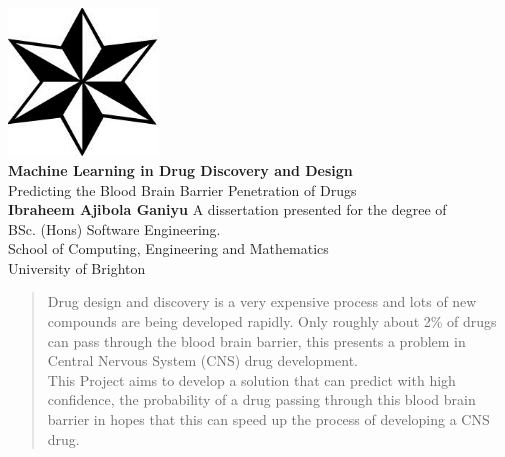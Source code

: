 \documentclass[a4paper,12pt]{report}
\begin{document}
\begin{titlepage}
	\begin{center}
		\includegraphics[scale=1,width=0.3\textwidth]{images/uob_logo} \\
		\huge
		\textbf{Machine Learning in Drug Discovery and Design\\}
		\vspace{0.5cm}
		\Large
		Predicting the Blood Brain Barrier Penetration of Drugs \\
		\vspace{1.5cm}
		\textbf{Ibraheem Ajibola Ganiyu}
		\vfill
		A dissertation presented for the degree of \\
		BSc. (Hons) Software Engineering. \\
		\vspace{0.8cm}
		\large
		School of Computing, Engineering and Mathematics \\
		University of Brighton \\
		\date{\today}
	\end{center}
\end{titlepage}

\tableofcontents
\newpage
\listoffigures
\listoftables
\newpage
{}


\begin{abstract}
	Drug design and discovery is a very expensive process and lots of new compounds are being developed rapidly. Only roughly about 2\% of drugs can pass through the blood brain barrier, this presents a problem in Central Nervous System (CNS) drug development. \\
	This Project aims to develop a solution that can predict with high confidence, the probability of a drug passing through this blood brain barrier in hopes that this can speed up the process of developing a CNS drug.
\end{abstract}
\end{document}
